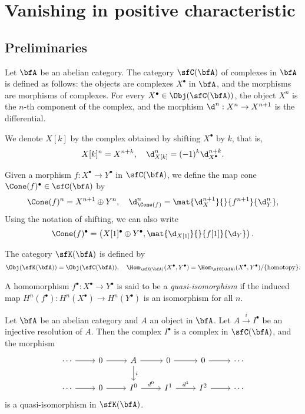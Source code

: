 \section{Vanishing in positive characteristic}


\subsection{Preliminaries}

    Let \(\bfA\) be an abelian category.
    The category \(\sfC(\bfA)\) of complexes in \(\bfA\) is defined as follows:
    the objects are complexes \(X^\bullet\) in \(\bfA\), and the morphisms are morphisms of complexes.
    For every \(X^\bullet \in \Obj(\sfC(\bfA))\), the object \(X^n\) is the \(n\)-th component of the complex, and the morphism \(\d^n: X^n \to X^{n+1}\) is the differential.
    
    We denote \(X[k]\) by the complex obtained by shifting \(X^\bullet\) by \(k\), that is,
    \[ X[k]^n = X^{n+k}, \quad \d^n_{X[k]} = (-1)^k \d^{n+k}_{X^\bullet}. \]
    
    Given a morphism \(f: X^\bullet \to Y^\bullet\) in \(\sfC(\bfA)\), we define the map cone \(\Cone(f)^\bullet \in \sfC(\bfA)\) by
    \[ \Cone(f)^n = X^{n+1} \oplus Y^n, \quad \d^n_{\Cone(f)} = \mat{\d^{n+1}_X}{}{f^{n+1}}{\d^n_Y}, \]
    Using the notation of shifting, we can also write
    \[ \Cone(f)^\bullet = \left( X[1]^\bullet \oplus Y^\bullet, \mat{\d_{X[1]}}{}{f[1]}{\d_Y} \right). \]


    The category \(\sfK(\bfA)\) is defined by 
    \[ \Obj(\sfK(\bfA)) = \Obj(\sfC(\bfA)),\quad \Hom_{\sfK(\bfA)}(X^\bullet, Y^\bullet) = \Hom_{\sfC(\bfA)}(X^\bullet, Y^\bullet)/\{\text{homotopy}\}. \]

    A homomorphism \(f^\bullet: X^\bullet \to Y^\bullet\) is said to be a \emph{quasi-isomorphism} if the induced map \(H^n(f^\bullet): H^n(X^\bullet) \to H^n(Y^\bullet)\) is an isomorphism for all \(n\).

    \begin{example}\label{eg:resolution_as_quasi_isomorphism}
        Let \(\bfA\) be an abelian category and \(A\) an object in \(\bfA\).
        Let \(A \xrightarrow{i} I^\bullet\) be an injective resolution of \(A\).
        Then the complex \(I^\bullet\) is a complex in \(\sfC(\bfA)\), and the morphism 
        \[
            \begin{tikzcd}
                \cdots \arrow[r] & 0 \arrow[r] & A \arrow[d, "i"] \arrow[r] & 0 \arrow[r] & 0 \arrow[r] & \cdots \\
                \cdots \arrow[r] & 0 \arrow[r] & I^0 \arrow[r, "d^0"] & I^1 \arrow[r, "d^1"] & I^2 \arrow[r] & \cdots 
            \end{tikzcd}
        \]
        is a quasi-isomorphism in \(\sfK(\bfA)\).
    \end{example}

